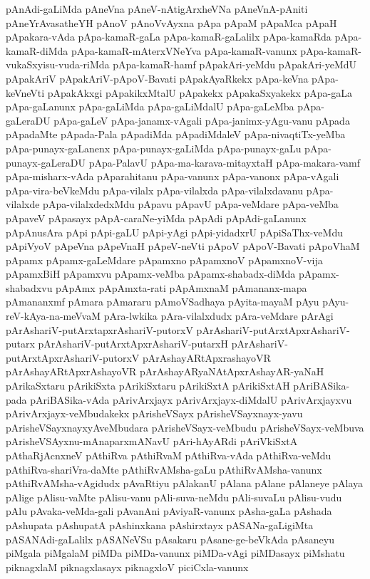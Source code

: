 {pAnAdi-gaLiMda
pAneVna
pAneV-nAtigArxheVNa
pAneVnA-pAniti
pAneYrAvasatheYH
pAnoV
pAnoVvAyxna
pApa
pApaM
pApaMca
pApaH
pApakara-vAda
pApa-kamaR-gaLa
pApa-kamaR-gaLalilx
pApa-kamaRda
pApa-kamaR-diMda
pApa-kamaR-mAterxVNeYva
pApa-kamaR-vanunx
pApa-kamaR-vukaSxyisu-vuda-riMda
pApa-kamaR-hamf
pApakAri-yeMdu
pApakAri-yeMdU
pApakAriV
pApakAriV-pApoV-Bavati
pApakAyaRkekx
pApa-keVna
pApa-keVneVti
pApakAkxgi
pApakikxMtalU
pApakekx
pApakaSxyakekx
pApa-gaLa
pApa-gaLanunx
pApa-gaLiMda
pApa-gaLiMdalU
pApa-gaLeMba
pApa-gaLeraDU
pApa-gaLeV
pApa-janamx-vAgali
pApa-janimx-yAgu-vanu
pApada
pApadaMte
pApada-Pala
pApadiMda
pApadiMdaleV
pApa-nivaqtiTx-yeMba
pApa-punayx-gaLanenx
pApa-punayx-gaLiMda
pApa-punayx-gaLu
pApa-punayx-gaLeraDU
pApa-PalavU
pApa-ma-karava-mitayxtaH
pApa-makara-vamf
pApa-misharx-vAda
pAparahitanu
pApa-vanunx
pApa-vanonx
pApa-vAgali
pApa-vira-beVkeMdu
pApa-vilalx
pApa-vilalxda
pApa-vilalxdavanu
pApa-vilalxde
pApa-vilalxdedxMdu
pApavu
pApavU
pApa-veMdare
pApa-veMba
pApaveV
pApasayx
pApA-caraNe-yiMda
pApAdi
pApAdi-gaLanunx
pApAnusAra
pApi
pApi-gaLU
pApi-yAgi
pApi-yidadxrU
pApiSaThx-veMdu
pApiVyoV
pApeVna
pApeVnaH
pApeV-neVti
pApoV
pApoV-Bavati
pApoVhaM
pApamx
pApamx-gaLeMdare
pApamxno
pApamxnoV
pApamxnoV-vija
pApamxBiH
pApamxvu
pApamx-veMba
pApamx-shabadx-diMda
pApamx-shabadxvu
pApAmx
pApAmxta-rati
pApAmxnaM
pAmananx-mapa
pAmananxmf
pAmara
pAmararu
pAmoVSadhaya
pAyita-mayaM
pAyu
pAyu-reV-kAya-na-meVvaM
pAra-lwkika
pAra-vilalxdudx
pAra-veMdare
pArAgi
pArAshariV-putArxtapxrAshariV-putorxV
pArAshariV-putArxtApxrAshariV-putarx
pArAshariV-putArxtApxrAshariV-putarxH
pArAshariV-putArxtApxrAshariV-putorxV
pArAshayARtApxrashayoVR
pArAshayARtApxrAshayoVR
pArAshayARyaNAtApxrAshayAR-yaNaH
pArikaSxtaru
pArikiSxta
pArikiSxtaru
pArikiSxtA
pArikiSxtAH
pAriBASika-pada
pAriBASika-vAda
pArivArxjayx
pArivArxjayx-diMdalU
pArivArxjayxvu
pArivArxjayx-veMbudakekx
pArisheVSayx
pArisheVSayxnayx-yavu
pArisheVSayxnayxyAveMbudara
pArisheVSayx-veMbudu
pArisheVSayx-veMbuva
pArisheVSAyxnu-mAnaparxmANavU
pAri-hAyARdi
pAriVkiSxtA
pAthaRjAcnxneV
pAthiRva
pAthiRvaM
pAthiRva-vAda
pAthiRva-veMdu
pAthiRva-shariVra-daMte
pAthiRvAMsha-gaLu
pAthiRvAMsha-vanunx
pAthiRvAMsha-vAgidudx
pAvaRtiyu
pAlakanU
pAlana
pAlane
pAlaneye
pAlaya
pAlige
pAlisu-vaMte
pAlisu-vanu
pAli-suva-neMdu
pAli-suvaLu
pAlisu-vudu
pAlu
pAvaka-veMda-gali
pAvanAni
pAviyaR-vanunx
pAsha-gaLa
pAshada
pAshupata
pAshupatA
pAshinxkana
pAshirxtayx
pASANa-gaLigiMta
pASANAdi-gaLalilx
pASANeVSu
pAsakaru
pAsane-ge-beVkAda
pAsaneyu
piMgala
piMgalaM
piMDa
piMDa-vanunx
piMDa-vAgi
piMDasayx
piMshatu
piknagxlaM
piknagxlasayx
piknagxloV
piciCxla-vanunx
}
